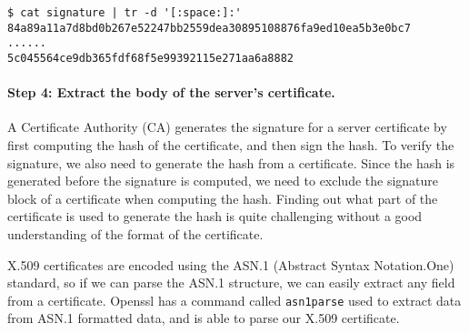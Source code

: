 \begin{lstlisting}
$ cat signature | tr -d '[:space:]:'
84a89a11a7d8bd0b267e52247bb2559dea30895108876fa9ed10ea5b3e0bc7
......
5c045564ce9db365fdf68f5e99392115e271aa6a8882
\end{lstlisting}



\begin{comment}
\begin{lstlisting}
$ openssl x509 -in Chase.crt -text -noout -certopt ca_default
               -certopt no_validity -certopt no_serial
	       -certopt no_subject -certopt no_extensions
	       -certopt no_signame | grep -v 'Signature Algorithm'
	                           | tr -d '[:space:]:'
\end{lstlisting}
\end{comment}



\paragraph{Step 4: Extract the body of the server's certificate.}
A Certificate Authority (CA) generates the signature for a server certificate by first
computing the hash of the certificate, and then sign the hash. To
verify the signature, we also need to generate the hash from a
certificate. Since the hash is generated before the signature is computed,
we need to exclude the signature block of a certificate when computing the
hash. Finding out what part of the certificate is used to
generate the hash is quite challenging without a good understanding
of the format of the certificate.




X.509 certificates are encoded using the ASN.1 (Abstract Syntax Notation.One) standard,
so if we can parse the ASN.1 structure, we can easily extract any field from a certificate.
Openssl has a command called \texttt{asn1parse} used to extract data from ASN.1 formatted data,
and is able to parse our X.509 certificate.



